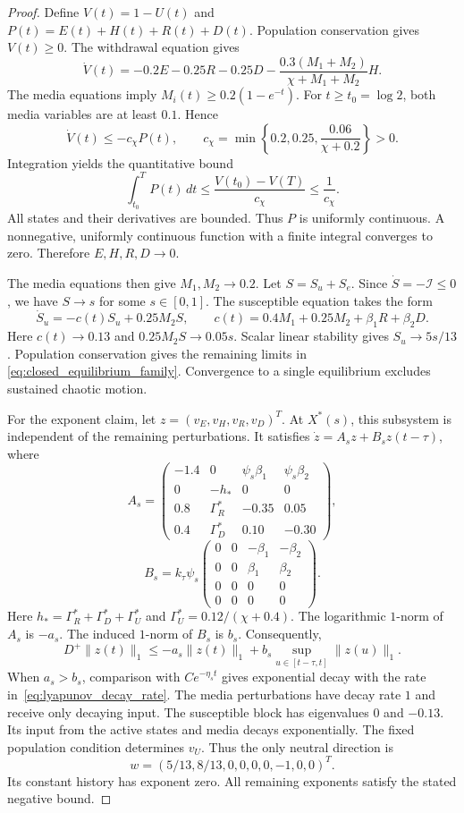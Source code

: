 \begin{proof}
Define $V(t)=1-U(t)$ and $P(t)=E(t)+H(t)+R(t)+D(t)$.
Population conservation gives $V(t)\ge0$.
The withdrawal equation gives
\[
\dot V(t)
=-0.2E-0.25R-0.25D
-\frac{0.3(M_1+M_2)}{\chi+M_1+M_2}H.
\]
The media equations imply $M_i(t)\ge0.2(1-e^{-t})$.
For $t\ge t_0=\log 2$, both media variables are at least $0.1$.
Hence
\[
\dot V(t)\le-c_\chi P(t),\qquad
c_\chi=\min\left\{0.2,0.25,\frac{0.06}{\chi+0.2}\right\}>0.
\]
Integration yields the quantitative bound
\begin{equation}
\int_{t_0}^{T}P(t)\,dt
\le\frac{V(t_0)-V(T)}{c_\chi}
\le\frac{1}{c_\chi}.
\label{eq:lyapunov_activity_bound}
\end{equation}
All states and their derivatives are bounded.
Thus $P$ is uniformly continuous.
A nonnegative, uniformly continuous function with a finite integral
converges to zero.
Therefore $E,H,R,D\to0$.

The media equations then give $M_1,M_2\to0.2$.
Let $S=S_u+S_e$.
Since $\dot S=-\mathcal I\le0$, we have $S\to s$ for some $s\in[0,1]$.
The susceptible equation takes the form
\[
\dot S_u=-c(t)S_u+0.25M_2S,\qquad
c(t)=0.4M_1+0.25M_2+\beta_1R+\beta_2D.
\]
Here $c(t)\to0.13$ and $0.25M_2S\to0.05s$.
Scalar linear stability gives $S_u\to5s/13$.
Population conservation gives the remaining limits in
\eqref{eq:closed_equilibrium_family}.
Convergence to a single equilibrium excludes sustained chaotic motion.

For the exponent claim, let $z=(v_E,v_H,v_R,v_D)^T$.
At $X^*(s)$, this subsystem is independent of the remaining perturbations.
It satisfies $\dot z=A_s z+B_s z(t-\tau)$, where
\[
A_s=
\begin{pmatrix}
-1.4&0&\psi_s\beta_1&\psi_s\beta_2\\
0&-h_*&0&0\\
0.8&\Gamma_R^*&-0.35&0.05\\
0.4&\Gamma_D^*&0.10&-0.30
\end{pmatrix},
\]
\[
B_s=k_\tau\psi_s
\begin{pmatrix}
0&0&-\beta_1&-\beta_2\\
0&0&\beta_1&\beta_2\\
0&0&0&0\\
0&0&0&0
\end{pmatrix}.
\]
Here $h_*=\Gamma_R^*+\Gamma_D^*+\Gamma_U^*$ and
$\Gamma_U^*=0.12/(\chi+0.4)$.
The logarithmic $1$-norm of $A_s$ is $-a_s$.
The induced $1$-norm of $B_s$ is $b_s$.
Consequently,
\[
D^+\|z(t)\|_1
\le-a_s\|z(t)\|_1
+b_s\sup_{u\in[t-\tau,t]}\|z(u)\|_1.
\]
When $a_s>b_s$, comparison with $C e^{-\eta_s t}$ gives
exponential decay with the rate in~\eqref{eq:lyapunov_decay_rate}.
The media perturbations have decay rate $1$ and receive only decaying input.
The susceptible block has eigenvalues $0$ and $-0.13$.
Its input from the active states and media decays exponentially.
The fixed population condition determines $v_U$.
Thus the only neutral direction is
\[
w=(5/13,8/13,0,0,0,0,-1,0,0)^T.
\]
Its constant history has exponent zero.
All remaining exponents satisfy the stated negative bound.
\end{proof}

